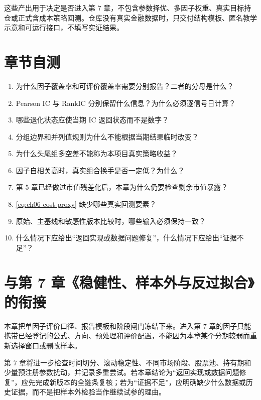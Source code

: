 这些产出用于决定是否进入第 7 章，不包含参数择优、多因子权重、真实目标持仓或正式含成本策略回测。仓库没有真实金融数据时，只交付结构模板、匿名教学示意和可运行接口，不填写实证结果。

\section{章节自测}

\begin{quizbox}
\begin{enumerate}
  \item 为什么因子覆盖率和可评价覆盖率需要分别报告？二者的分母是什么？
  \item Pearson IC 与 RankIC 分别保留什么信息？为什么必须逐信号日计算？
  \item 哪些退化状态应使当期 IC 返回状态而不是数字？
  \item 分组边界和并列值规则为什么不能根据当期结果临时改变？
  \item 为什么头尾组多空差不能称为本项目真实策略收益？
  \item 因子自相关高时，真实组合换手是否一定低？为什么？
  \item 第 5 章已经做过市值残差化后，本章为什么仍要检查剩余市值暴露？
  \item \cref{eq:ch06-cost-proxy} 缺少哪些真实回测要素？
  \item 原始、主基线和敏感性版本比较时，哪些输入必须保持一致？
  \item 什么情况下应给出“返回实现或数据问题修复”，什么情况下应给出“证据不足”？
\end{enumerate}
\end{quizbox}

\section{与第 7 章《稳健性、样本外与反过拟合》的衔接}

本章把单因子评价口径、报告模板和阶段闸门冻结下来。进入第 7 章的因子只能携带已经登记的公式、方向、预处理和评价配置，不能因为本章某个分期较弱而重新选择窗口或删改样本。

第 7 章将进一步检查时间切分、滚动稳定性、不同市场阶段、股票池、持有期和少量预注册参数扰动，并记录多重尝试。若本章结论为“返回实现或数据问题修复”，应先完成新版本的全链条复核；若为“证据不足”，应明确缺少什么数据或历史证据，而不是把样本外检验当作继续试参的理由。
